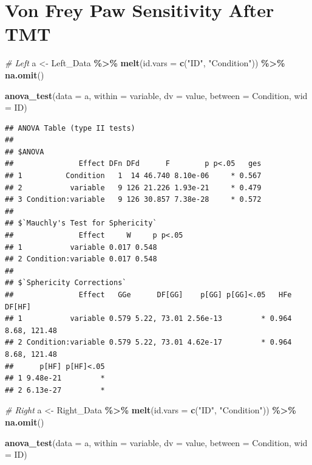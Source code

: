 \documentclass[
]{book}
\newenvironment{Shaded}{\begin{snugshade}}{\end{snugshade}}
\newcommand{\AttributeTok}[1]{\textcolor[rgb]{0.13,0.29,0.53}{#1}}
\newcommand{\CommentTok}[1]{\textcolor[rgb]{0.56,0.35,0.01}{\textit{#1}}}
\newcommand{\FunctionTok}[1]{\textcolor[rgb]{0.13,0.29,0.53}{\textbf{#1}}}
\newcommand{\NormalTok}[1]{#1}
\newcommand{\OtherTok}[1]{\textcolor[rgb]{0.56,0.35,0.01}{#1}}
\newcommand{\SpecialCharTok}[1]{\textcolor[rgb]{0.81,0.36,0.00}{\textbf{#1}}}
\newcommand{\StringTok}[1]{\textcolor[rgb]{0.31,0.60,0.02}{#1}}
\begin{document}
\section*{Von Frey Paw Sensitivity After TMT}\label{von-frey-paw-sensitivity-after-tmt}

\begin{Shaded}
\begin{Highlighting}[]
\CommentTok{\# Left}
\NormalTok{a }\OtherTok{\textless{}{-}}\NormalTok{ Left\_Data }\SpecialCharTok{\%\textgreater{}\%}
  \FunctionTok{melt}\NormalTok{(}\AttributeTok{id.vars =} \FunctionTok{c}\NormalTok{(}\StringTok{"ID"}\NormalTok{, }\StringTok{"Condition"}\NormalTok{)) }\SpecialCharTok{\%\textgreater{}\%}
  \FunctionTok{na.omit}\NormalTok{()}

\FunctionTok{anova\_test}\NormalTok{(}\AttributeTok{data =}\NormalTok{ a, }\AttributeTok{within =}\NormalTok{ variable, }\AttributeTok{dv =}\NormalTok{ value, }\AttributeTok{between =}\NormalTok{ Condition, }\AttributeTok{wid =}\NormalTok{ ID)}
\end{Highlighting}
\end{Shaded}

\begin{verbatim}
## ANOVA Table (type II tests)
## 
## $ANOVA
##               Effect DFn DFd      F        p p<.05   ges
## 1          Condition   1  14 46.740 8.10e-06     * 0.567
## 2           variable   9 126 21.226 1.93e-21     * 0.479
## 3 Condition:variable   9 126 30.857 7.38e-28     * 0.572
## 
## $`Mauchly's Test for Sphericity`
##               Effect     W     p p<.05
## 1           variable 0.017 0.548      
## 2 Condition:variable 0.017 0.548      
## 
## $`Sphericity Corrections`
##               Effect   GGe      DF[GG]    p[GG] p[GG]<.05   HFe       DF[HF]
## 1           variable 0.579 5.22, 73.01 2.56e-13         * 0.964 8.68, 121.48
## 2 Condition:variable 0.579 5.22, 73.01 4.62e-17         * 0.964 8.68, 121.48
##      p[HF] p[HF]<.05
## 1 9.48e-21         *
## 2 6.13e-27         *
\end{verbatim}

\begin{Shaded}
\begin{Highlighting}[]
\CommentTok{\# Right}
\NormalTok{a }\OtherTok{\textless{}{-}}\NormalTok{ Right\_Data }\SpecialCharTok{\%\textgreater{}\%}
  \FunctionTok{melt}\NormalTok{(}\AttributeTok{id.vars =} \FunctionTok{c}\NormalTok{(}\StringTok{"ID"}\NormalTok{, }\StringTok{"Condition"}\NormalTok{)) }\SpecialCharTok{\%\textgreater{}\%}
  \FunctionTok{na.omit}\NormalTok{()}

\FunctionTok{anova\_test}\NormalTok{(}\AttributeTok{data =}\NormalTok{ a, }\AttributeTok{within =}\NormalTok{ variable, }\AttributeTok{dv =}\NormalTok{ value, }\AttributeTok{between =}\NormalTok{ Condition, }\AttributeTok{wid =}\NormalTok{ ID)}
\end{Highlighting}
\end{Shaded}
\end{document}
